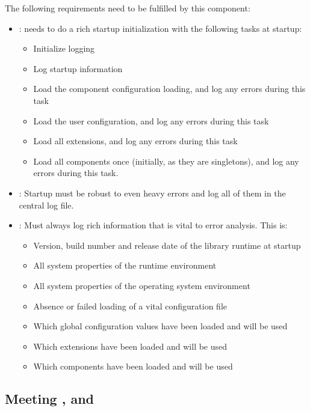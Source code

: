 The following requirements need to be fulfilled by this component:
\begin{itemize}
	\item \REQUcontextStartupTasks{}: \COMPcontext{} needs to do a rich startup initialization with the following tasks at \LibName{} startup:
	\begin{itemize}
		\item Initialize logging
		\item Log \LibName{} startup information
		\item Load the component configuration loading, and log any errors during this task
		\item Load the user configuration, and log any errors during this task
		\item Load all extensions, and log any errors during this task
		\item Load all components once (initially, as they are singletons), and log any errors 				during this task.
	\end{itemize}
	\item \REQUcontextRobustStartup{}: Startup must be robust to even heavy errors and log all of them in the central log file.
	\item \REQUcontextVerboseLogging{}: Must always log rich information that is vital to error analysis. This is:
	\begin{itemize}
		\item Version, build number and release date of the library runtime at startup
		\item All system properties of the runtime environment
		\item All system properties of the operating system environment
		\item Absence or failed loading of a vital configuration file
		\item Which global configuration values have been loaded and will be used
		\item Which extensions have been loaded and will be used
		\item Which components have been loaded and will be used
	\end{itemize}
\end{itemize}


\subsection{Meeting \REQUcontextStartupTasks{}, \REQUcontextRobustStartup{} and 
\REQUcontextVerboseLogging{}}
\label{sec:REQUcontextStartupTasks}

